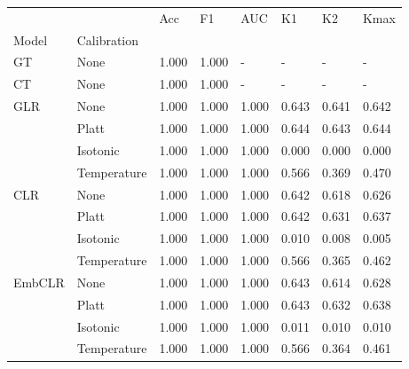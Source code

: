 \begin{tabular}{llllllll}
\toprule
 &  & Acc & F1 & AUC & K1 & K2 & Kmax \\
Model & Calibration &  &  &  &  &  &  \\
\midrule
GT & None & 1.000 & 1.000 & - & - & - & - \\
\cline{1-8}
CT & None & 1.000 & 1.000 & - & - & - & - \\
\cline{1-8}
\multirow[t]{4}{*}{GLR} & None & 1.000 & 1.000 & 1.000 & 0.643 & 0.641 & 0.642 \\
 & Platt & 1.000 & 1.000 & 1.000 & 0.644 & 0.643 & 0.644 \\
 & Isotonic & 1.000 & 1.000 & 1.000 & 0.000 & 0.000 & 0.000 \\
 & Temperature & 1.000 & 1.000 & 1.000 & 0.566 & 0.369 & 0.470 \\
\cline{1-8}
\multirow[t]{4}{*}{CLR} & None & 1.000 & 1.000 & 1.000 & 0.642 & 0.618 & 0.626 \\
 & Platt & 1.000 & 1.000 & 1.000 & 0.642 & 0.631 & 0.637 \\
 & Isotonic & 1.000 & 1.000 & 1.000 & 0.010 & 0.008 & 0.005 \\
 & Temperature & 1.000 & 1.000 & 1.000 & 0.566 & 0.365 & 0.462 \\
\cline{1-8}
\multirow[t]{4}{*}{EmbCLR} & None & 1.000 & 1.000 & 1.000 & 0.643 & 0.614 & 0.628 \\
 & Platt & 1.000 & 1.000 & 1.000 & 0.643 & 0.632 & 0.638 \\
 & Isotonic & 1.000 & 1.000 & 1.000 & 0.011 & 0.010 & 0.010 \\
 & Temperature & 1.000 & 1.000 & 1.000 & 0.566 & 0.364 & 0.461 \\
\cline{1-8}
\bottomrule
\end{tabular}
